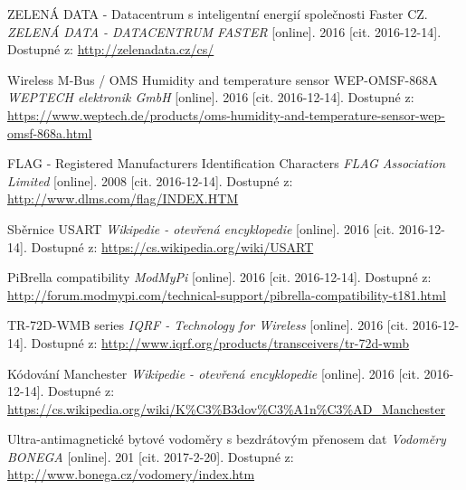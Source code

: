 \begin{literatura}{99}
 ZELENÁ DATA - Datacentrum s inteligentní energií společnosti Faster CZ. \textit{ZELENÁ DATA - DATACENTRUM FASTER} [online]. 2016 [cit. 2016-12-14]. Dostupné z: \url{http://zelenadata.cz/cs/}
				
 Wireless M-Bus / OMS Humidity and temperature sensor WEP-OMSF-868A \textit{WEPTECH elektronik GmbH} [online]. 2016 [cit. 2016-12-14]. Dostupné z: \url{https://www.weptech.de/products/oms-humidity-and-temperature-sensor-wep-omsf-868a.html}

 	 	FLAG - Registered Manufacturers Identification Characters \textit{FLAG Association Limited} [online]. 2008 [cit. 2016-12-14]. Dostupné z: \url{http://www.dlms.com/flag/INDEX.HTM}

 Sběrnice USART \textit{Wikipedie - otevřená encyklopedie} [online]. 2016 [cit. 2016-12-14]. Dostupné z: \url{https://cs.wikipedia.org/wiki/USART}

 PiBrella compatibility \textit{ModMyPi} [online]. 2016 [cit. 2016-12-14]. Dostupné z: \url{http://forum.modmypi.com/technical-support/pibrella-compatibility-t181.html}

 TR-72D-WMB series \textit{IQRF - Technology for Wireless} [online]. 2016 [cit. 2016-12-14]. Dostupné z: \url{http://www.iqrf.org/products/transceivers/tr-72d-wmb}

 Kódování Manchester \textit{Wikipedie - otevřená encyklopedie} [online]. 2016 [cit. 2016-12-14]. Dostupné z: \url{https://cs.wikipedia.org/wiki/K\%C3\%B3dov\%C3\%A1n\%C3\%AD\_Manchester}

 Ultra-antimagnetické bytové vodoměry s bezdrátovým přenosem dat \textit{Vodoměry BONEGA} [online]. 201 [cit. 2017-2-20]. Dostupné z: \url{http://www.bonega.cz/vodomery/index.htm}



\end{literatura}
